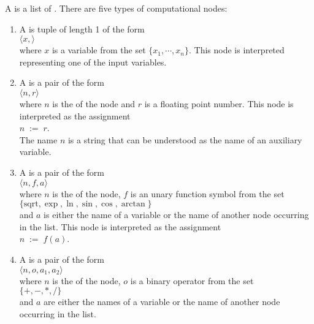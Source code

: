 \begin{Definition}
  A   is a list of 
  .  There are five types of computational nodes:
  \begin{enumerate}
  \item A  is tuple of length 1 of the form   
        \\[0.2cm]
        \hspace*{1.3cm}
        $\langle x, \rangle$
        \\[0.2cm]
        where $x$ is a variable from the set $\{x_1,\cdots,x_n\}$.
        This node is interpreted representing one of the input variables.
  \item A  is a pair of the form
        \\[0.2cm]
        \hspace*{1.3cm}
        $\langle n, r\rangle$
        \\[0.2cm]
        where $n$ is the  of the node and $r$ is a floating point number.  This node is interpreted
        as the assignment
        \\[0.2cm]
        \hspace*{1.3cm}
        $n \;\mathtt{:=}\; r$.
        \\[0.2cm]
        The name $n$ is a string that can be understood as the name of an auxiliary variable.
  \item A  is a pair of the form
        \\[0.2cm]
        \hspace*{1.3cm}
        $\langle n, f, a\rangle$
        \\[0.2cm]
        where $n$ is the  of the node, $f$ is an unary function symbol from the set
        \\[0.2cm]
        \hspace*{1.3cm}
        $\{ \mathrm{sqrt}, \exp, \ln, \sin, \cos, \arctan \}$
        \\[0.2cm]
        and $a$ is either the name of a variable or the name of another node occurring in the list.
        This node is interpreted as the assignment
        \\[0.2cm]
        \hspace*{1.3cm}
        $n \;\mathtt{:=}\; f(a)$.        
  \item A  is a pair of the form
        \\[0.2cm]
        \hspace*{1.3cm}
        $\langle n, o, a_1, a_2\rangle$
        \\[0.2cm]
        where $n$ is the  of the node, $o$ is a binary operator from the set
        \\[0.2cm]
        \hspace*{1.3cm}
        $\{ +, -, *, / \}$
        \\[0.2cm]
        and $a$ are either the names of a variable or the name of another node occurring in the list.
        

\end{enumerate}
\end{Definition}
